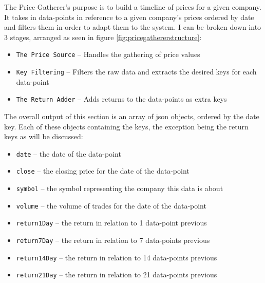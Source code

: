 The Price Gatherer's purpose is to build a timeline of prices for a given company. It takes in data-points in reference to a given company's prices ordered by date and filters them in order to adapt them to the system. I can be broken down into 3 stages, arranged as seen in figure \ref{fig:pricegathererstructure}:
\begin{itemize}
    \item \texttt{The Price Source} -- Handles the gathering of price values
    \item \texttt{Key Filtering} -- Filters the raw data and extracts the desired keys for each data-point
    \item \texttt{The Return Adder} -- Adds returns to the data-points as extra keys
\end{itemize}

The overall output of this section is an array of json objects, ordered by the date key. Each of these objects containing the keys, the exception being the return keys as will be discussed:
\begin{itemize}
    \item \texttt{date} -- the date of the data-point
    \item \texttt{close} -- the closing price for the date of the data-point
    \item \texttt{symbol} -- the symbol representing the company this data is about
    \item \texttt{volume} -- the volume of trades for the date of the data-point
    \item \texttt{return1Day} -- the return in relation to 1 data-point previous
    \item \texttt{return7Day} -- the return in relation to 7 data-points previous
    \item \texttt{return14Day} -- the return in relation to 14 data-points previous
    \item \texttt{return21Day} -- the return in relation to 21 data-points previous
\end{itemize}


